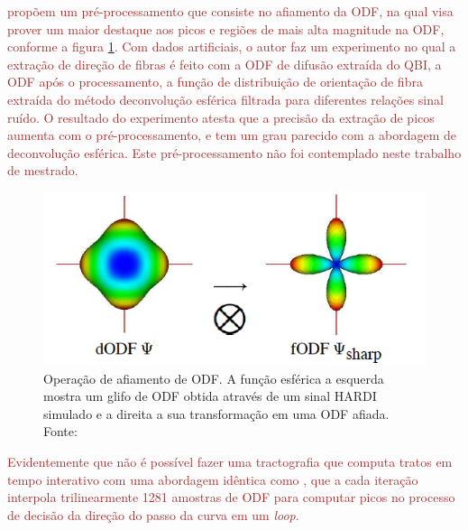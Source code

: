 \documentclass[
    12pt,                %
    oneside,            %
    a4paper,            %
    english,            %
    french,                %
    spanish,            %
    brazil                %
    ]{abntex2}
\begin{document}



\textcolor{brown}{
 propõem um pré-processamento que consiste no afiamento da ODF, na qual visa prover um maior destaque aos picos e regiões de mais alta magnitude na ODF, conforme a figura \ref{fig::sharpening}. Com dados artificiais, o autor faz um experimento no qual a extração de direção de fibras é feito com a ODF de difusão extraída do QBI, a ODF após o processamento, a função de distribuição de orientação de fibra extraída do método deconvolução esférica filtrada para diferentes relações sinal ruído. O resultado do experimento atesta que a precisão da extração de picos aumenta com o pré-processamento, e tem um grau parecido com a abordagem de deconvolução esférica. Este pré-processamento não foi contemplado neste trabalho de mestrado.
}

\begin{figure}[h]
    \centering
    \includegraphics[width=.45\linewidth, angle=0]{figs/Tractografia/sharpening.png}
     \caption{Operação de afiamento de ODF. A função esférica a esquerda mostra um glifo de ODF obtida através de um sinal HARDI simulado e a direita a sua transformação em uma ODF afiada. \\
     Fonte: \cite{descoteaux2007}
     }
     \label{fig::sharpening}
\end{figure}

\textcolor{brown}{
Evidentemente que não é possível fazer uma tractografia que computa tratos em tempo interativo com uma abordagem idêntica como , que a cada iteração interpola trilinearmente 1281 amostras de ODF para computar picos no processo de decisão da direção do passo da curva em um \textit{loop}.
}
\end{document}

